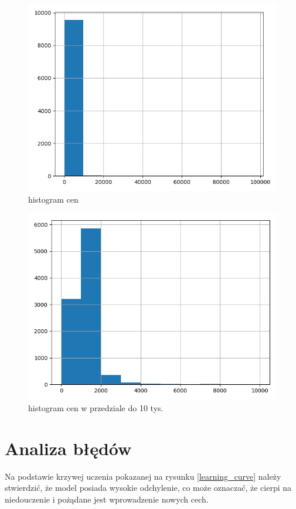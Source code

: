 \documentclass[a4paper,12pt]{article}
\begin{document}
		
		\begin{figure}[h]
					\centering
					\includegraphics[scale=0.6]{obrazy/hist.png} 
					\caption{histogram cen}
					\label{hist}
		\end{figure}
		\begin{figure}[h]
					\centering
					\includegraphics[scale=0.6]{obrazy/hist10.png} 
					\caption{histogram cen w przedziale do 10 tys.}
					\label{hist10k}
		\end{figure}
		
\section{Analiza błędów}
	Na podstawie krzywej uczenia pokazanej na rysunku \ref{learning_curve} należy stwierdzić, że model posiada wysokie odchylenie, co może oznaczać, że cierpi na niedouczenie i pożądane jest wprowadzenie nowych cech.
	
\end{document}
